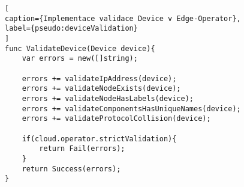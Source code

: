 \begin{lstfloat}
\begin{lstlisting}[
caption={Implementace validace Device v Edge-Operator},
label={pseudo:deviceValidation}
]
func ValidateDevice(Device device){
    var errors = new([]string);

    errors += validateIpAddress(device);
    errors += validateNodeExists(device);
    errors += validateNodeHasLabels(device);
    errors += validateComponentsHasUniqueNames(device);
    errors += validateProtocolCollision(device);

    if(cloud.operator.strictValidation){
        return Fail(errors);
    }
    return Success(errors);
}
\end{lstlisting}
\end{lstfloat}